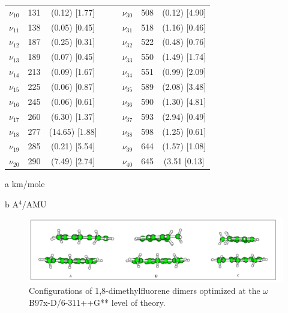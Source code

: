 \begin{table}[H]
\begin{center}
\begin{threeparttable}
\begin{tabular}{c c c c c c c c}
$\nu_{10}$& 131 & (0.12)  [1.77] &  &    & $\nu_{30}$ & 508 & (0.12)  [4.90] \\ 
$\nu_{11}$&  138 & (0.05)  [0.45] &  &    & $\nu_{31}$ & 518 & (1.16)  [0.46] \\ 
$\nu_{12}$&  187 & (0.25)  [0.31] &  &    & $\nu_{32}$ & 522 & (0.48)  [0.76] \\ 
$\nu_{13}$&  189 & (0.07)  [0.45] &  &    & $\nu_{33}$ & 550 & (1.49)  [1.74] \\ 
$\nu_{14}$&  213 & (0.09)  [1.67] &  &    & $\nu_{34}$ & 551 & (0.99)  [2.09] \\ 
$\nu_{15}$&  225 & (0.06)  [0.87] &  &    & $\nu_{35}$ & 589 & (2.08)  [3.48] \\ 
$\nu_{16}$&  245 & (0.06)  [0.61] &  &    & $\nu_{36}$ & 590 & (1.30)  [4.81] \\ 
$\nu_{17}$&  260 & (6.30)  [1.37] &  &    & $\nu_{37}$ & 593 & (2.94)  [0.49] \\ 
$\nu_{18}$&  277 & (14.65)  [1.88] &  &   & $\nu_{38}$ & 598 & (1.25)  [0.61] \\ 
$\nu_{19}$&  285 & (0.21)  [5.54] &  &    & $\nu_{39}$ & 644 & (1.57)  [1.08] \\ 
$\nu_{20}$&  290 & (7.49)  [2.74] &  &    & $\nu_{40}$ & 645 & (3.51  [0.13] \\ 
	\bottomrule
\end{tabular}

\begin{tablenotes}
	\item[a] km/mole
	\item[b] A$^{4}$/AMU
\end{tablenotes}
\end{threeparttable}
\end{center}
\label{lowfreq-1-methylflDi}
\end{table}	





\begin{figure}[H]
	\begin{center}
	\includegraphics[scale=0.9]{image/18MCC}	
	\end{center}
	\caption{ Configurations of 1,8-dimethylfluorene dimers optimized at the $\omega$B97x-D/6-311++G** level of theory. }
\end{figure}


